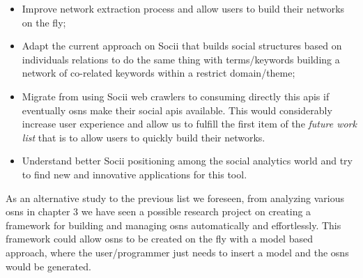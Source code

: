 \begin{itemize}
    \item Improve network extraction process and allow users to build their networks on the fly;
    \item Adapt the current approach on Socii that builds social structures based on individuals relations to do the same thing with terms/keywords
    building a network of co-related keywords within a restrict domain/theme;
    \item Migrate from using Socii web crawlers to consuming directly this \glspl{api} if eventually \glspl{osn} make their social \glspl{api} available. This would considerably increase user experience and allow us to fulfill the first item of the \textit{future work list} that is to allow users to quickly build their networks.
    \item Understand better Socii positioning among the social analytics world and try to find new and innovative applications for this tool.
\end{itemize}

As an alternative study to the previous list we foreseen, from analyzing various \glspl{osn} in chapter 3 we have seen a possible research project on creating a framework for building and managing \glspl{osn} automatically and effortlessly. This framework could allow \glspl{osn} to be created on the fly with a model based approach, where the user/programmer just needs to insert a model and the \glspl{osn} would be generated.

